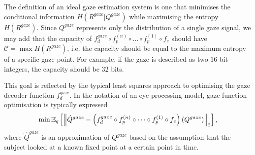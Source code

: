 
The definition of an ideal gaze estimation system is one that minimises the conditional information $H(R^{gaze}|Q^{gaze})$ while maximising the entropy $H(R^{gaze})$. Since $Q^{gaze}$ represents only the distribution of a single gaze signal, we may add that the capacity of $f^{gaze}_d \circ f_p^{(n)} \circ \dots \circ f_p^{(1)} \circ f_e$ should have $\mathcal{C} = \max H(R^{gaze})$, i.e. the capacity should be equal to the maximum entropy of a specific gaze point. For example, if the gaze is described as two $16$-bit integers, the capacity should be $32$ bits.

This goal is reflected by the typical least squares approach to optimising the gaze decoder function $f^{gaze}_d$. In the notation of an eye processing model, gaze function optimisation is typically expressed
\begin{align}
    \min \mathbb{E}_{q}\left[\left\lVert\hat{Q}^{gaze} - \left(f^{gaze}_d \circ f_p^{(n)} \circ \dots \circ f_p^{(1)} \circ f_e\right)(Q^{gaze})\right\rVert_2\right],
\end{align}
where $\hat{Q}^{gaze}$ is an approximation of $Q^{gaze}$ based on the assumption that the subject looked at a known fixed point at a certain point in time.



